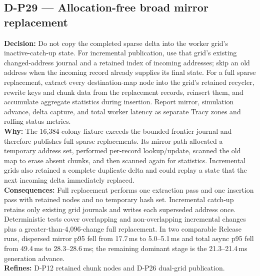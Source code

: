 \subsection*{D-P29 --- Allocation-free broad mirror replacement}
\begin{decisionbox}[title={D-P29 \quad 2026-08-11}]
\textbf{Decision:} Do not copy the completed sparse delta into the worker
grid's inactive-catch-up state. For incremental publication, use that grid's
existing changed-address journal and a retained index of incoming addresses;
skip an old address when the incoming record already supplies its final state.
For a full sparse replacement, extract every destination-map node into the
grid's retained recycler, rewrite keys and chunk data from the replacement
records, reinsert them, and accumulate aggregate statistics during insertion.
Report mirror, simulation advance, delta capture, and total worker latency as
separate Tracy zones and rolling status metrics.\\
\textbf{Why:} The 16,384-colony fixture exceeds the bounded frontier journal
and therefore publishes full sparse replacements. Its mirror path allocated a
temporary address set, performed per-record lookup/update, scanned the old map
to erase absent chunks, and then scanned again for statistics. Incremental
grids also retained a complete duplicate delta and could replay a state that
the next incoming delta immediately replaced.\\
\textbf{Consequences:} Full replacement performs one extraction pass and one
insertion pass with retained nodes and no temporary hash set. Incremental
catch-up retains only existing grid journals and writes each superseded address
once. Deterministic tests cover overlapping and non-overlapping incremental
changes plus a greater-than-4,096-change full replacement. In two comparable
Release runs, dispersed mirror p95 fell from 17.7\,ms to 5.0--5.1\,ms and total
async p95 fell from 49.4\,ms to 28.3--28.6\,ms; the remaining dominant stage is
the 21.3--21.4\,ms generation advance.\\
\textbf{Refines:} D-P12 retained chunk nodes and D-P26 dual-grid publication.
\end{decisionbox}

